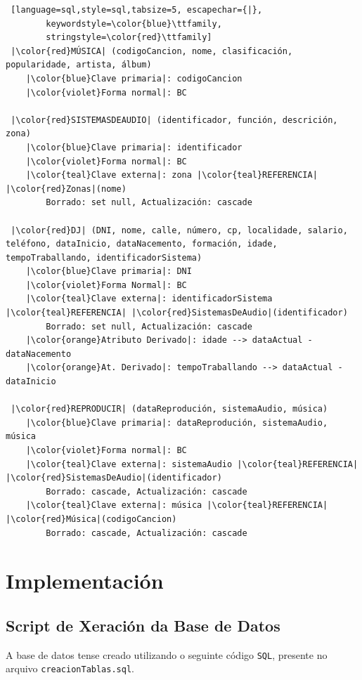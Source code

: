 \documentclass[12pt,a4paper]{book}
\theoremstyle{definition}
\theoremstyle{break}
\begin{document}
\begin{lstlisting} [language=sql,style=sql,tabsize=5, escapechar={|},
		keywordstyle=\color{blue}\ttfamily,
		stringstyle=\color{red}\ttfamily]
 |\color{red}MÚSICA| (codigoCancion, nome, clasificación, popularidade, artista, álbum)
	|\color{blue}Clave primaria|: codigoCancion
	|\color{violet}Forma normal|: BC
		
 |\color{red}SISTEMASDEAUDIO| (identificador, función, descrición, zona)
	|\color{blue}Clave primaria|: identificador
	|\color{violet}Forma normal|: BC
	|\color{teal}Clave externa|: zona |\color{teal}REFERENCIA| |\color{red}Zonas|(nome)
		Borrado: set null, Actualización: cascade
		
 |\color{red}DJ| (DNI, nome, calle, número, cp, localidade, salario, teléfono, dataInicio, dataNacemento, formación, idade, tempoTraballando, identificadorSistema)
	|\color{blue}Clave primaria|: DNI
	|\color{violet}Forma Normal|: BC
	|\color{teal}Clave externa|: identificadorSistema |\color{teal}REFERENCIA| |\color{red}SistemasDeAudio|(identificador)
		Borrado: set null, Actualización: cascade
	|\color{orange}Atributo Derivado|: idade --> dataActual - dataNacemento
	|\color{orange}At. Derivado|: tempoTraballando --> dataActual - dataInicio
		
 |\color{red}REPRODUCIR| (dataReprodución, sistemaAudio, música)
	|\color{blue}Clave primaria|: dataReprodución, sistemaAudio, música
	|\color{violet}Forma normal|: BC
	|\color{teal}Clave externa|: sistemaAudio |\color{teal}REFERENCIA| |\color{red}SistemasDeAudio|(identificador)
		Borrado: cascade, Actualización: cascade
	|\color{teal}Clave externa|: música |\color{teal}REFERENCIA| |\color{red}Música|(codigoCancion)
		Borrado: cascade, Actualización: cascade
	\end{lstlisting}
	
	
	\chapter{Implementación}
	\section{Script de Xeración da Base de Datos}
	
	A base de datos tense creado utilizando o seguinte código \texttt{SQL}, presente no arquivo \texttt{creacionTablas.sql}.
	
\end{document}
